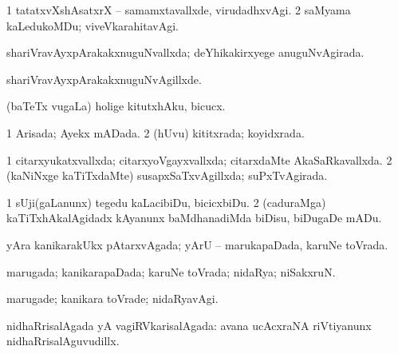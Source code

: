 {{\bentry
{} 
\gl{\kirxvi}
\expl{}
\bmng
\bnum
\num{1} tatatxvXshAsatxrX -- samamxtavallxde, virudadhxvAgi. 
\num{2} saMyama kaLedukoMDu; viveVkarahitavAgi. 
\enum
\emng
\eentry

\bentry
{} 
\gl{\gu}
\expl{}
\bmng
shariVravAyxpArakakxnuguNvallxda; deYhikakirxyege anuguNvAgirada. 
\emng
\eentry

\bentry
{} 
\gl{\gu}
\expl{}
\bmng
{} 
\emng
\eentry

\bentry
{} 
\gl{\kirxvi}
\expl{}
\bmng
shariVravAyxpArakakxnuguNvAgillxde. 
\emng
\eentry

\bentry
{} 
\gl{\akirx}
\expl{}
\bmng
(baTeTx \mo vugaLa) holige kitutxhAku, bicucx. 
\emng
\eentry

\bentry
{} 
\gl{\gu}
\expl{}
\bmng
\bnum
\num{1} Arisada; Ayekx mADada. 
\num{2} (hUvu) kititxrada; koyidxrada. 
\enum
\emng
\eentry

\bentry
{} 
\gl{\gu}
\expl{}
\bmng
\bnum
\num{1} citarxyukatxvallxda; citarxyoVgayxvallxda; citarxdaMte AkaSaRkavallxda. 
\num{2} (kaNiNxge kaTiTxdaMte) susapxSaTxvAgillxda; suPxTvAgirada. 
\enum
\emng
\eentry

\bentry
{} 
\gl{\akirx}
\bmng
\bnum
\num{1} sUji(gaLanunx) tegedu kaLacibiDu, bicicxbiDu. 
\num{2} (caduraMga) kaTiTxhAkalAgidadx kAyanunx baMdhanadiMda biDisu, biDugaDe mADu. 
\enum
\emng
\eentry

\bentry
{} 
\gl{\gu}
\expl{}
\bmng
yAra kanikarakUkx pAtarxvAgada; yArU -- marukapaDada, karuNe toVrada. 
\emng
\eentry

\bentry
{} 
\gl{\gu}
\expl{}
\bmng
marugada; kanikarapaDada; karuNe toVrada; nidaRya; niSakxruN. 
\emng
\eentry

\bentry
{} 
\gl{\kirxvi}
\expl{}
\bmng
marugade; kanikara toVrade; nidaRyavAgi. 
\emng
\eentry

\bentry
{} 
\gl{\gu}
\expl{}
\bmng
nidhaRrisalAgada yA vagiRVkarisalAgada:  avana ucAcxraNA riVtiyanunx nidhaRrisalAguvudillx. 
\emng
\eentry

}}
